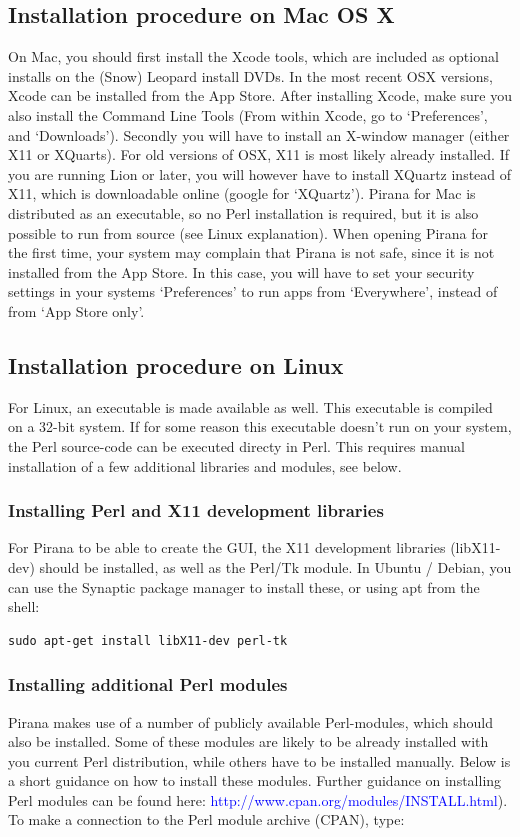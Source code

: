\subsection{Installation procedure on Mac OS X} On Mac, you should
first install the Xcode tools, which are
included as optional installs on the (Snow) Leopard install DVDs. In the most recent OSX versions, Xcode can be installed from the App Store. After installing Xcode, make sure you also install the Command Line Tools (From within Xcode, go to `Preferences', and `Downloads'). Secondly you will have to install an X-window manager (either X11 or XQuarts). For old versions of OSX, X11 is most likely already installed. If you are running Lion or later, you will however have to install XQuartz instead of X11, which is downloadable online (google for `XQuartz'). Pirana for Mac is distributed as an executable, so no Perl installation is required, but it is also possible to run from source (see Linux explanation). When opening Pirana for the first time, your system may complain that Pirana is not safe, since it is not installed from the App Store. In this case, you will have to set your security settings in your systems `Preferences' to run apps from `Everywhere', instead of from `App Store only'.

\subsection{Installation procedure on Linux} For Linux, an executable
is made available as well. This executable is compiled on a 32-bit
system. If for some reason this executable doesn't run on your system,
the Perl source-code can be executed directy in Perl. This requires
manual installation of a few additional libraries and modules, see below.

\subsubsection*{Installing Perl and X11 development libraries}
For Pirana to be able to create the GUI, the X11 development libraries
(libX11-dev) should be installed, as well as the Perl/Tk module. In
Ubuntu / Debian, you can use the Synaptic package manager to install
these, or using apt from the shell:

\begin{lstlisting} 
sudo apt-get install libX11-dev perl-tk
\end{lstlisting}

\subsubsection*{Installing additional Perl modules}
\noindent Pirana makes use of a number of publicly available
Perl-modules, which should also be installed. Some of these modules
are likely to be already installed with you current Perl distribution,
while others have to be installed manually. Below is a short guidance
on how to install these modules. Further guidance on installing Perl
modules can be found here: \textcolor{Blue}{
  http://www.cpan.org/modules/INSTALL.html}). To make a connection to
the Perl module archive (CPAN), type:

